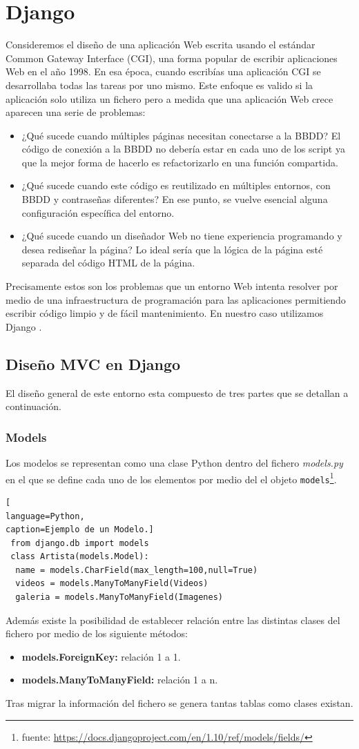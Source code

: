 \section{Django}
Consideremos el diseño de una aplicación Web escrita usando el estándar Common Gateway Interface (CGI), una forma popular de escribir aplicaciones Web en el año 1998. En esa época, cuando escribías una aplicación CGI se desarrollaba todas las tareas por uno mismo. Este enfoque es valido si la aplicación solo utiliza un fichero pero a medida que una aplicación Web crece aparecen una serie de problemas:
\begin{itemize}
\item ¿Qué sucede cuando múltiples páginas necesitan conectarse a la BBDD? El código de conexión a la BBDD no debería estar en cada uno de los script ya que la mejor forma de hacerlo es refactorizarlo en una función compartida.
\item ¿Qué sucede cuando este código es reutilizado en múltiples entornos, con BBDD y contraseñas diferentes? En ese punto, se vuelve esencial alguna configuración específica del entorno.
\item ¿Qué sucede cuando un diseñador Web no tiene experiencia programando y desea rediseñar la página? Lo ideal sería que la lógica de la página esté separada del código HTML de la página.
\end{itemize}
Precisamente estos son los problemas que un entorno Web intenta resolver por medio de una infraestructura de programación para las aplicaciones permitiendo escribir código limpio y de fácil mantenimiento. En nuestro caso utilizamos Django \cite{django}.
\subsection{Diseño MVC en Django}
El diseño general de este entorno esta compuesto de tres partes que se detallan a continuación.
\subsubsection*{Models}
Los modelos se representan como una clase Python dentro del fichero \textit{models.py} en el que se define cada uno de los elementos por medio del el objeto \texttt{models}\footnote{fuente: \url{https://docs.djangoproject.com/en/1.10/ref/models/fields/}}.
\begin{lstlisting}[
language=Python,
caption=Ejemplo de un Modelo.]
 from django.db import models
 class Artista(models.Model):
  name = models.CharField(max_length=100,null=True)
  videos = models.ManyToManyField(Videos) 
  galeria = models.ManyToManyField(Imagenes)
\end{lstlisting}
Además existe la posibilidad de establecer relación entre las distintas clases del fichero por medio de los siguiente métodos:
\begin{itemize}
\item \textbf{models.ForeignKey:} relación 1 a 1.
\item\textbf{ models.ManyToManyField:} relación 1 a n.
\end{itemize}
Tras migrar la información del fichero se genera tantas tablas como clases existan.
